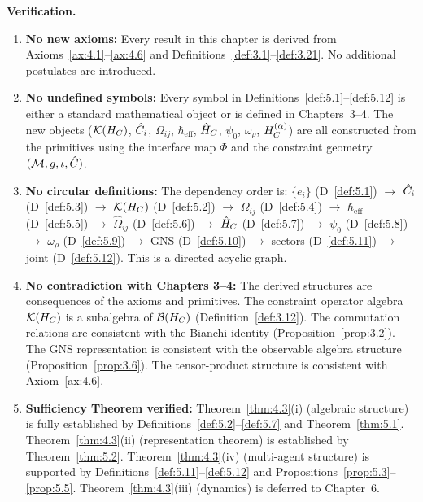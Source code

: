 \noindent\textbf{Verification.}
\begin{enumerate}
  \item \textbf{No new axioms:}
    Every result in this chapter is derived from
    Axioms~\ref{ax:4.1}--\ref{ax:4.6} and
    Definitions~\ref{def:3.1}--\ref{def:3.21}.  No additional postulates
    are introduced.

  \item \textbf{No undefined symbols:}
    Every symbol in Definitions~\ref{def:5.1}--\ref{def:5.12} is either
    a standard mathematical object or is defined in Chapters~3--4.
    The new objects ($\mathcal{K}(H_C)$, $\hat{C}_i$, $\Omega_{ij}$,
    $\hbar_{\mathrm{eff}}$, $\hat{H}_C$, $\psi_0$, $\omega_\rho$,
    $H_C^{(\alpha)}$) are all constructed from the primitives using
    the interface map $\Phi$ and the constraint geometry $(\mathcal{M}, g,
    \iota, \hat{C})$.

  \item \textbf{No circular definitions:}
    The dependency order is:
    $\{e_i\}$ (D~\ref{def:5.1}) $\to$ $\hat{C}_i$ (D~\ref{def:5.3})
    $\to$ $\mathcal{K}(H_C)$ (D~\ref{def:5.2}) $\to$ $\Omega_{ij}$
    (D~\ref{def:5.4}) $\to$ $\hbar_{\mathrm{eff}}$ (D~\ref{def:5.5})
    $\to$ $\hat\Omega_{ij}$ (D~\ref{def:5.6}) $\to$ $\hat{H}_C$
    (D~\ref{def:5.7}) $\to$ $\psi_0$ (D~\ref{def:5.8}) $\to$
    $\omega_\rho$ (D~\ref{def:5.9}) $\to$ GNS (D~\ref{def:5.10})
    $\to$ sectors (D~\ref{def:5.11}) $\to$ joint (D~\ref{def:5.12}).
    This is a directed acyclic graph.

  \item \textbf{No contradiction with Chapters 3--4:}
    The derived structures are consequences of the axioms and primitives.
    The constraint operator algebra $\mathcal{K}(H_C)$ is a subalgebra of
    $\mathcal{B}(H_C)$ (Definition~\ref{def:3.12}).  The commutation relations
    are consistent with the Bianchi identity
    (Proposition~\ref{prop:3.2}).  The GNS representation is consistent
    with the observable algebra structure
    (Proposition~\ref{prop:3.6}).  The tensor-product structure is
    consistent with Axiom~\ref{ax:4.6}.

  \item \textbf{Sufficiency Theorem verified:}
    Theorem~\ref{thm:4.3}(i) (algebraic structure) is fully established
    by Definitions~\ref{def:5.2}--\ref{def:5.7} and
    Theorem~\ref{thm:5.1}.  Theorem~\ref{thm:4.3}(ii) (representation
    theorem) is established by Theorem~\ref{thm:5.2}.
    Theorem~\ref{thm:4.3}(iv) (multi-agent structure) is supported by
    Definitions~\ref{def:5.11}--\ref{def:5.12} and
    Propositions~\ref{prop:5.3}--\ref{prop:5.5}.
    Theorem~\ref{thm:4.3}(iii) (dynamics) is deferred to Chapter~6.
\end{enumerate}

